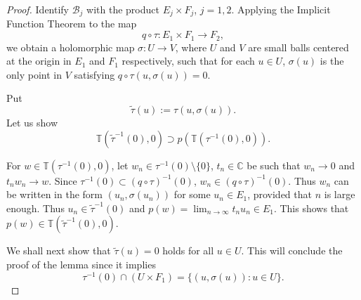 \documentclass{amsart}
\numberwithin{equation}{section}
\newcommand{\C}{\mathbb C}
\theoremstyle{definition}
\theoremstyle{remark}
\begin{document}
\begin{proof} Identify $\mathcal{B}_j$ with the product $E_j\times F_j$, $j=1,2$. 
Applying the Implicit Function Theorem to the map $$q\circ \tau:E_1\times F_1\to F_2,$$ 
we obtain a holomorphic map $\sigma: U\to V$, where $U$ and $V$ are small balls centered at the origin in $E_1$ and $F_1$ respectively, such that for each $u\in U$, $\sigma(u)$ is the only point in $V$ satisfying $q\circ \tau (u,\sigma(u))=0$. 

Put $$\widetilde{\tau}(u):=\tau(u,\sigma(u)).$$ Let us show
\begin{equation}\label{eqn:tildetau}
\mathbb{T}(\widetilde{\tau}^{-1}(0),0)\supset p(\mathbb{T}(\tau^{-1}(0),0)).
\end{equation}


For $w\in \mathbb{T}(\tau^{-1}(0),0)$,
let $w_n\in \tau^{-1}(0)\setminus \{0\}$, $t_n\in \C$ be such that 
$w_n\to 0$ and $t_n w_n\to w$. Since $\tau^{-1}(0)\subset (q\circ \tau)^{-1}(0)$, $w_n\in (q\circ \tau)^{-1}(0)$. Thus $w_n$ can be written in the form $(u_n, \sigma(u_n))$ for some $u_n\in E_1$, provided that $n$ is large enough. 
Thus $u_n\in \widetilde{\tau}^{-1}(0)$ and $p(w)=\lim_{n\to\infty} t_nu_n\in E_1$. This shows that $p(w)\in \mathbb{T}(\widetilde{\tau}^{-1}(0),0)$.
%
 





We shall next show that 
$\widetilde{\tau}(u)=0$ holds for all $u\in U$. 
This will conclude the proof of the lemma since it implies 
$$\tau^{-1}(0)\cap (U\times F_1)=\{(u,\sigma(u)): u\in U\}.$$ 


\end{proof}
\end{document}
